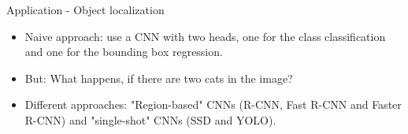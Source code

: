 \begin{vbframe}{Application - Object localization}
\begin{figure}
            \end{figure}
            \begin{itemize}
            \item Naive approach: use a CNN with two heads, one for the class classification and one for the bounding box regression.
            \item But: What happens, if there are two cats in the image?
                \item Different approaches: "Region-based" CNNs (R-CNN, Fast R-CNN and Faster R-CNN) and "single-shot" CNNs (SSD and YOLO).
            \end{itemize}
            \end{vbframe}
            
            
            
            
            
            
            
            
            
